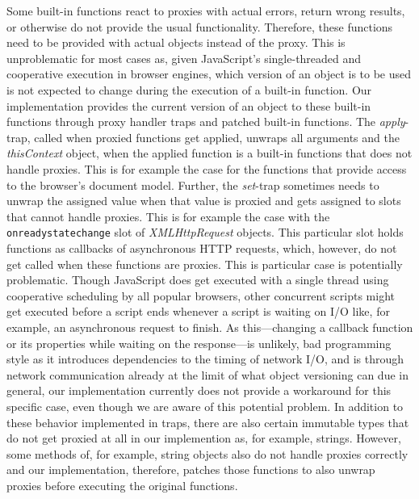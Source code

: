 Some built-in functions react to proxies with actual errors, return wrong results, or otherwise do not provide the usual functionality.
Therefore, these functions need to be provided with actual objects instead of the proxy.
This is unproblematic for most cases as, given JavaScript's single-threaded and cooperative execution in browser engines, which version of an object is to be used is not expected to change during the execution of a built-in function.
Our implementation provides the current version of an object to these built-in functions through proxy handler traps and patched built-in functions.
The \emph{apply}-trap, called when proxied functions get applied, unwraps all arguments and the \emph{thisContext} object, when the applied function is a built-in functions that does not handle proxies.
This is for example the case for the functions that provide access to the browser's document model.
Further, the \emph{set}-trap sometimes needs to unwrap the assigned value when that value is proxied and gets assigned to slots that cannot handle proxies.
This is for example the case with the \lstinline{onreadystatechange} slot of \emph{XMLHttpRequest} objects.
This particular slot holds functions as callbacks of asynchronous HTTP requests, which, however, do not get called when these functions are proxies.
This is particular case is potentially problematic.
Though JavaScript does get executed with a single thread  using cooperative scheduling by all popular browsers, other concurrent scripts might get executed before a script ends whenever a script is waiting on I/O like, for example, an asynchronous request to finish.
As this---changing a callback function or its properties while waiting on the response---is unlikely, bad programming style as it introduces dependencies to the timing of network I/O, and is through network communication already at the limit of what object versioning can due in general, our implementation currently does not provide a workaround for this specific case, even though we are aware of this potential problem. 
In addition to these behavior implemented in traps, there are also certain immutable types that do not get proxied at all in our implemention as, for example, strings.
However, some methods of, for example, string objects also do not handle proxies correctly and our implementation, therefore, patches those functions to also unwrap proxies before executing the original functions.











